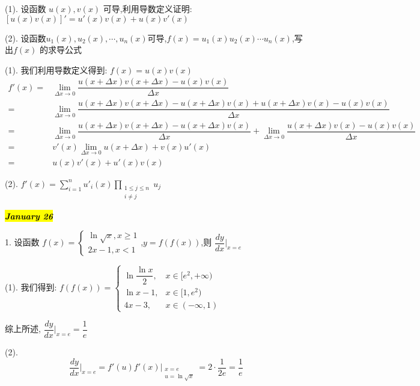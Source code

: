 (1). 设函数 $u(x),v(x)$ 可导,利用导数定义证明:$[u(x)v(x)]'=u'(x)v(x)+u(x)v'(x)$

(2). 设函数$u_{1}(x),u_{2}(x),\cdots,u_{n}(x)$可导,$f(x)=u_{1}(x)u_{2}(x)\cdots u_{n}(x)$,写出$f(x)$ 的求导公式
\begin{solution}

	(1). 我们利用导数定义得到: $f(x) = u(x)v(x)$
	\begin{align*}
		f'(x) = & \lim\limits_{\Delta x\to 0}\dfrac{u(x+\Delta x)v(x+\Delta x)-u(x)v(x)}{\Delta x}\\
		  	  = & \lim\limits_{\Delta x\to 0}\dfrac{u(x+\Delta x)v(x+\Delta x)-u(x+\Delta x)v(x)+u(x+\Delta x)v(x)-u(x)v(x)}{\Delta x}\\
		      = & \lim\limits_{\Delta x\to 0}\dfrac{u(x+\Delta x)v(x+\Delta x)-u(x+\Delta x)v(x)}{\Delta x}+\lim\limits_{\Delta x\to 0}\dfrac{u(x+\Delta x)v(x)-u(x)v(x)}{\Delta x}\\
		      = & v'(x)\lim\limits_{\Delta x\to 0} u(x+\Delta x)+v(x)u'(x)\\
			  = & u(x)v'(x)+u'(x)v(x)
	\end{align*}

	(2). $f'(x) = \sum\limits_{i=1}^{n}u'_{i}(x)\prod\limits_{\substack{1\leq j\leq n\\ i\neq j }}u_{j}$
\end{solution}

\hl{\textbf{\textit{January 26}}}

1. 设函数 $f(x)=\begin{cases}
	\ln\sqrt{x},x\geq 1\\2x-1,x<1
\end{cases}$,$y=f(f(x))$,则 $\dfrac{dy}{dx}\big|_{x=e}$
\begin{solution}

	(1). 我们得到: $f(f(x)) = 
	\begin{cases}
		\ln\dfrac{\ln x}{2}, & x\in[e^{2},+\infty)\\
		\ln x -1, & x\in [1,e^{2})\\
		4x-3, & x\in(-\infty,1)
	\end{cases}$

	综上所述, $\dfrac{dy}{dx}\big|_{x=e} = \dfrac{1}{e}$

	(2). $$\dfrac{dy}{dx}\big|_{x=e} = f'(u)f'(x)\big|_{\substack{x = e\\u = \ln\sqrt{x}}}=2\cdot \dfrac{1}{2e} =\dfrac{1}{e}$$
\end{solution}

